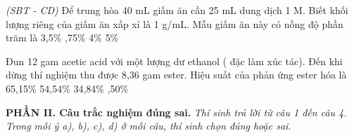 \documentclass[12pt,a4paper]{article}
\begin{document}
\begin{ex}
\textit{(SBT - CD)} Để trung hòa 40 mL giấm ăn cần 25 mL dung dịch  1 M. Biết khối lượng riêng của giấm ăn xấp xỉ là 1 g/mL. Mẫu giấm ăn này có nồng độ phần trăm là
\choice
{3,5\%}
{,75\%}
{4\%}
{5\%}

\end{ex}

\begin{ex}
Đun 12 gam acetic acid với một lượng dư ethanol ( đặc làm xúc tác). Đến khi dừng thí nghiệm thu được 8,36 gam ester. Hiệu suất của phản ứng ester hóa là
\choice
{65,15\%}
{54,54\%}
{34,84\%}
{,50\%}

\end{ex}

\vspace{0.3cm}
\noindent\textbf{\large PHẦN II. Câu trắc nghiệm đúng sai.}
\textit{Thí sinh trả lời từ câu 1 đến câu 4. Trong mỗi ý a), b), c), d) ở mỗi câu, thí sinh chọn đúng hoặc sai.}
\vspace{0.2cm}
\end{document}
